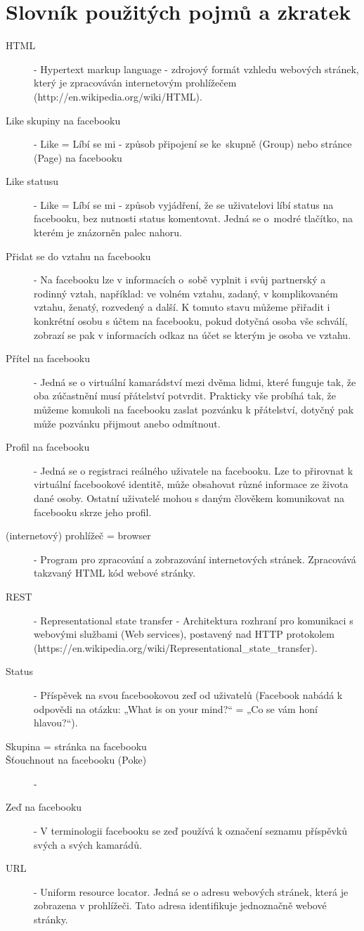 \documentclass[thesis=M,czech]{FITthesis}[2013/05/10]
\begin{document}
\chapter{Slovník použitých pojmů a zkratek}
\begin{description}
	\item[HTML] - Hypertext markup language - zdrojový formát vzhledu webových stránek, který je zpracováván internetovým prohlížečem
		\newline(http://en.wikipedia.org/wiki/HTML).
	\item[Like skupiny na facebooku] - Like = Líbí se mi - způsob připojení se ke~skupně (Group) nebo stránce (Page) na facebooku
	\item[Like statusu] - Like = Líbí se mi - způsob vyjádření, že se uživatelovi líbí status na facebooku, bez nutnosti status komentovat. Jedná se o~modré tlačítko, na kterém je znázorněn palec nahoru.
	\item[Přidat se do vztahu na facebooku] - Na facebooku lze v informacích o~sobě vyplnit i svůj partnerský a rodinný vztah, například: ve volném vztahu, zadaný, v komplikovaném vztahu, ženatý, rozvedený a další. K tomuto stavu můžeme přiřadit i konkrétní osobu s účtem na facebooku, pokud dotyčná osoba vše schválí, zobrazí se pak v informacích odkaz na účet se kterým je osoba ve vztahu.
	\item[Přítel na facebooku] - Jedná se o virtuální kamarádství mezi dvěma lidmi, které funguje tak, že oba zúčastnění musí přátelství potvrdit. Prakticky vše probíhá tak, že můžeme komukoli na facebooku zaslat pozvánku k přátelství, dotyčný pak může pozvánku přijmout anebo odmítnout.  
	\item[Profil na facebooku] - Jedná se o registraci reálného uživatele na facebooku. Lze to přirovnat k virtuální facebookové identitě, může obsahovat různé informace ze života dané osoby. Ostatní uživatelé mohou s daným člověkem komunikovat na facebooku skrze jeho profil.
	\item[(internetový) prohlížeč = browser] - Program pro zpracování a zobrazování internetových stránek. Zpracovává takzvaný HTML kód webové stránky.
	\item[REST] - Representational state transfer - Architektura rozhraní pro komunikaci s webovými službami (Web services), postavený nad HTTP protokolem
\newline(https://en.wikipedia.org/wiki/Representational\_state\_transfer).
	\item[Status] - Příspěvek na svou facebookovou zeď od uživatelů (Facebook nabádá k odpovědi na otázku: „What is on your mind?“ = „Co se vám honí hlavou?“).
	\item[Skupina = stránka na facebooku]
	\item[Šťouchnout na facebooku (Poke)] -
	\item[Zeď na facebooku] - V terminologii facebooku se zeď používá k označení seznamu příspěvků svých a svých kamarádů.
	\item[URL] - Uniform resource locator. Jedná se o adresu webových stránek, která je zobrazena v prohlížeči. Tato adresa identifikuje jednoznačně webové stránky. 
\end{description}
\end{document}
